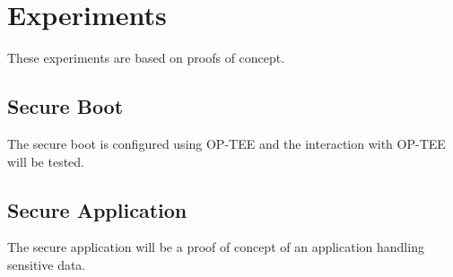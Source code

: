 \documentclass{report}
\begin{document}
\chapter{Experiments}

These experiments are based on proofs of concept.

\section{Secure Boot}

The secure boot is configured using OP-TEE and the interaction with OP-TEE will be tested.

\section{Secure Application}

The secure application will be a proof of concept of an application handling sensitive data.
\end{document}
